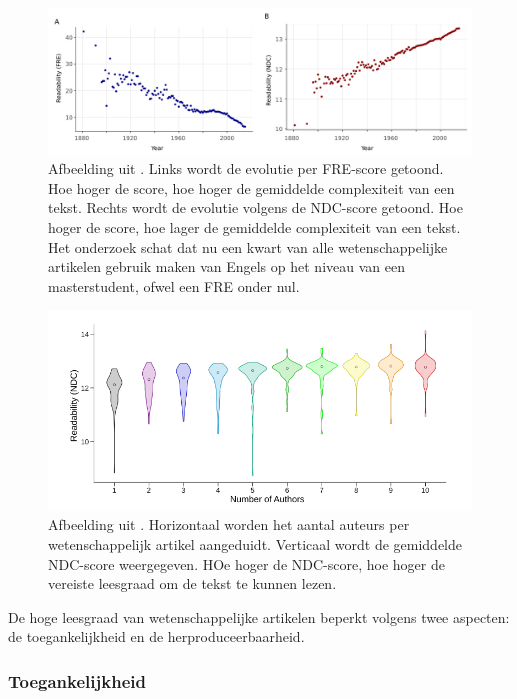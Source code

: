 \begin{figure}[H]
	\includegraphics[width=\linewidth]{img/fre-ndc.png}
	\caption{Afbeelding uit \textcite{PlavenSigray2017}. Links wordt de evolutie per FRE-score getoond. Hoe hoger de score, hoe hoger de gemiddelde complexiteit van een tekst. Rechts wordt de evolutie volgens de NDC-score getoond. Hoe hoger de score, hoe lager de gemiddelde complexiteit van een tekst. Het onderzoek schat dat nu een kwart van alle wetenschappelijke artikelen gebruik maken van Engels op het niveau van een masterstudent, ofwel een FRE onder nul.}
\end{figure}

\begin{figure}[H]
	\includegraphics[width=\linewidth]{img/ndc-number-of-authors.png}
	\caption{Afbeelding uit \textcite{PlavenSigray2017}. Horizontaal worden het aantal auteurs per wetenschappelijk artikel aangeduidt. Verticaal wordt de gemiddelde NDC-score weergegeven. HOe hoger de NDC-score, hoe hoger de vereiste leesgraad om de tekst te kunnen lezen.}
\end{figure}

De hoge leesgraad van wetenschappelijke artikelen beperkt volgens \textcite{PlavenSigray2017} twee aspecten: de toegankelijkheid en de herproduceerbaarheid.

\subsubsection{Toegankelijkheid}

